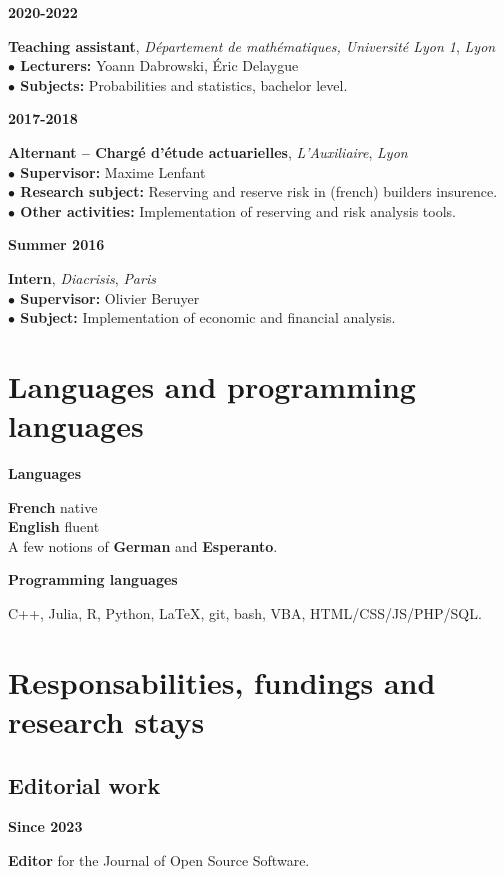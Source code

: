 \documentclass[a4paper,11pt]{article}
\newcommand{\tabcv}[2]{
\begin{minipage}[t]{0.12\linewidth}
\textbf{\footnotesize #1}
\end{minipage}\hfill
\begin{minipage}[t]{0.85\linewidth}
#2
\end{minipage}
\vspace{1em}
}
\begin{document}
\begin{flushleft}
\tabcv{2020-2022}{
\textbf{Teaching assistant}, \textit{Département de mathématiques, Université Lyon 1}, \textit{Lyon}\\[0.5em]
{\footnotesize
\textbf{$\bullet$ Lecturers:} Yoann Dabrowski, Éric Delaygue\\
\textbf{$\bullet$ Subjects:} Probabilities and statistics, bachelor level.\\
}
}

\tabcv{2017-2018}{
\textbf{Alternant -- Chargé d'étude actuarielles}, \textit{L'Auxiliaire}, \textit{Lyon}\\[0.5em]
{\footnotesize
\textbf{$\bullet$ Supervisor:} Maxime Lenfant\\
\textbf{$\bullet$ Research subject:} Reserving and reserve risk in (french) builders insurence.\\
\textbf{$\bullet$ Other activities:} Implementation of reserving and risk analysis tools.\\
}
}


\tabcv{Summer 2016}{
\textbf{Intern}, \textit{Diacrisis}, \textit{Paris}\\[0.5em]
{\footnotesize
\textbf{$\bullet$ Supervisor:} Olivier Beruyer\\
\textbf{$\bullet$ Subject:} Implementation of economic and financial analysis. \\
}
}

\end{flushleft}

\section{Languages and programming languages}
\tabcv{Languages}{
\textbf{French} native\\ 
\textbf{English} fluent\\ 
A few notions of \textbf{German} and \textbf{Esperanto}.\\
}
\tabcv{Programming languages}{
C++, Julia, R, Python, \LaTeX, git, bash, VBA, HTML/CSS/JS/PHP/SQL.\\
}

\section{Responsabilities, fundings and research stays}

\subsection{Editorial work}
\tabcv{Since 2023}{
\textbf{Editor} for the {{Journal of Open Source Software}}.\\[0.5em]
}
\end{document}
